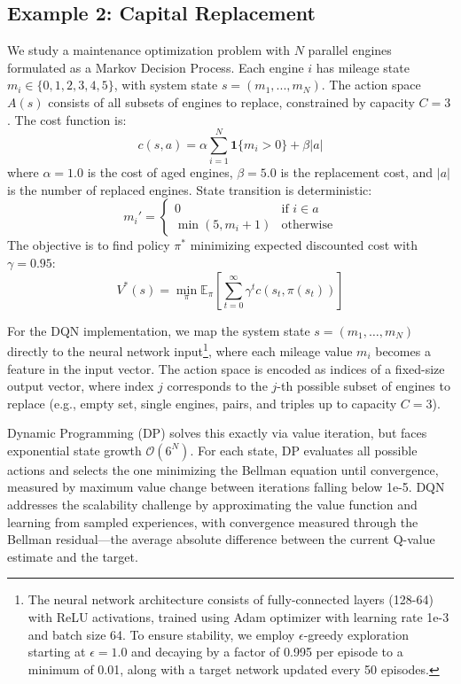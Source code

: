 \subsection{Example 2: Capital Replacement}
We study a maintenance optimization problem with $N$ parallel engines formulated as a Markov Decision Process. Each engine $i$ has mileage state $m_i \in \{0,1,2,3,4,5\}$, with system state $s = (m_1,...,m_N)$. The action space $A(s)$ consists of all subsets of engines to replace, constrained by capacity $C=3$. The cost function is:
\begin{equation}
c(s,a) = \alpha \sum_{i=1}^{N} \mathbf{1}\{m_i > 0\} + \beta |a|
\end{equation}
where $\alpha=1.0$ is the cost of aged engines, $\beta=5.0$ is the replacement cost, and $|a|$ is the number of replaced engines. State transition is deterministic:
\begin{equation}
m_i' =
\begin{cases}
0 & \text{if } i \in a \\
\min(5, m_i+1) & \text{otherwise}
\end{cases}
\end{equation}
The objective is to find policy $\pi^*$ minimizing expected discounted cost with $\gamma=0.95$:
\begin{equation}
V^*(s) = \min_{\pi} \mathbb{E}_{\pi} \left[ \sum_{t=0}^{\infty} \gamma^t c(s_t, \pi(s_t)) \right]
\end{equation}

For the DQN implementation, we map the system state $s = (m_1,\ldots,m_N)$ directly to the neural network input\footnote{The neural network architecture consists of fully-connected layers (128-64) with ReLU activations, trained using Adam optimizer with learning rate 1e-3 and batch size 64. To ensure stability, we employ $\epsilon$-greedy exploration starting at $\epsilon=1.0$ and decaying by a factor of 0.995 per episode to a minimum of 0.01, along with a target network updated every 50 episodes.}, where each mileage value $m_i$ becomes a feature in the input vector. The action space is encoded as indices of a fixed-size output vector, where index $j$ corresponds to the $j$-th possible subset of engines to replace (e.g., empty set, single engines, pairs, and triples up to capacity $C=3$). 

Dynamic Programming (DP) solves this exactly via value iteration, but faces exponential state growth $\mathcal{O}(6^N)$. For each state, DP evaluates all possible actions and selects the one minimizing the Bellman equation until convergence, measured by maximum value change between iterations falling below 1e-5. DQN addresses the scalability challenge by approximating the value function and learning from sampled experiences, with convergence measured through the Bellman residual—the average absolute difference between the current Q-value estimate and the target.

